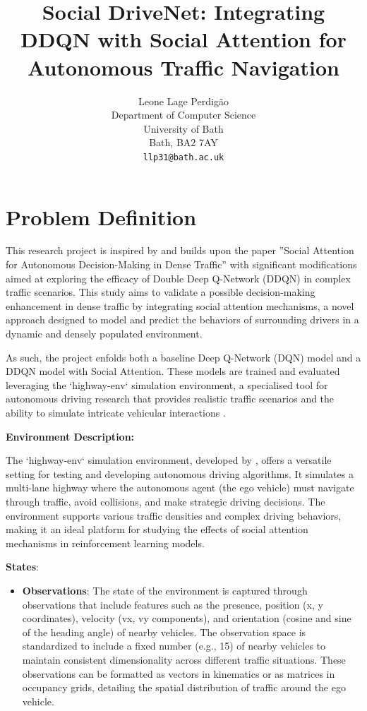 \documentclass{article}
\title{Social DriveNet: Integrating DDQN with Social Attention for Autonomous Traffic Navigation}
\author{
  Leone Lage Perdigão
  \\
  Department of Computer Science\\
  University of Bath\\
  Bath, BA2 7AY \\
  \texttt{llp31@bath.ac.uk} \\
}
\begin{document}
\maketitle

\section{Problem Definition}

This research project is inspired by and builds upon the paper ''Social Attention for Autonomous Decision-Making in Dense Traffic'' \citep{leurent2019social} with significant modifications aimed at exploring the efficacy of Double Deep Q-Network (DDQN) in complex traffic scenarios. This study aims to validate a possible decision-making enhancement in dense traffic by integrating social attention mechanisms, a novel approach designed to model and predict the behaviors of surrounding drivers in a dynamic and densely populated environment.

As such, the project enfolds both a baseline Deep Q-Network (DQN) model and a DDQN model with Social Attention. These models are trained and evaluated leveraging the `highway-env` simulation environment, a specialised tool for autonomous driving research that provides realistic traffic scenarios and the ability to simulate intricate vehicular interactions \citep{highway-env}.

\textbf{Environment Description:}
\par The `highway-env` simulation environment, developed by \citet{highway-env}, offers a versatile setting for testing and developing autonomous driving algorithms. It simulates a multi-lane highway where the autonomous agent (the ego vehicle) must navigate through traffic, avoid collisions, and make strategic driving decisions. The environment supports various traffic densities and complex driving behaviors, making it an ideal platform for studying the effects of social attention mechanisms in reinforcement learning models.

\textbf{States}:
\begin{itemize}
  \item \textbf{Observations}: The state of the environment is captured through observations that include features such as the presence, position (x, y coordinates), velocity (vx, vy components), and orientation (cosine and sine of the heading angle) of nearby vehicles. The observation space is standardized to include a fixed number (e.g., 15) of nearby vehicles to maintain consistent dimensionality across different traffic situations. These observations can be formatted as vectors in kinematics or as matrices in occupancy grids, detailing the spatial distribution of traffic around the ego vehicle.
\end{itemize}
\end{document}
